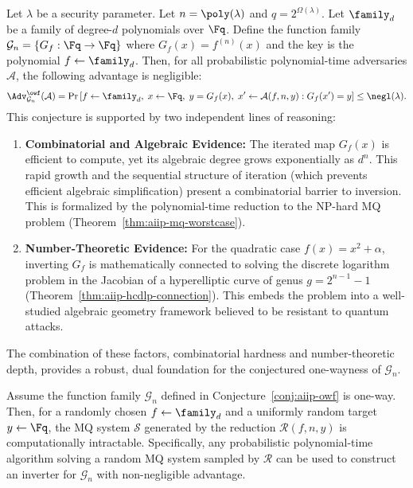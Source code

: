             \begin{conjecture}\label{conj:aiip-owf}
                Let $\lambda$ be a security parameter. Let $n = \poly(\lambda)$ and $q = 2^{\Omega(\lambda)}$. Let $\family_d$ be a family of degree-$d$ polynomials over $\Fq$. Define the function family $\mathcal{G}_n = \{ G_f: \Fq \to \Fq \}$ where $G_f(x) = f^{(n)}(x)$ and the key is the polynomial $f \leftarrow \family_d$.
                Then, for all probabilistic polynomial-time adversaries $\mathcal{A}$, the following advantage is negligible:
                \begin{equation}
                    \Adv_{\mathcal{G}_n}^{\owf}(\mathcal{A}) = \Pr\left[
                    f \leftarrow \family_d,\; x \leftarrow \Fq,\; y = G_f(x),\; x' \leftarrow \mathcal{A}(f, n, y) : G_f(x') = y
                    \right] \leq \negl(\lambda).
                \end{equation}
                This conjecture is supported by two independent lines of reasoning:
                \begin{enumerate}[topsep=0pt, itemsep=0pt, parsep=0pt]
                    \item \textbf{Combinatorial and Algebraic Evidence:} The iterated map $G_f(x)$ is efficient to compute, yet its algebraic degree grows exponentially as $d^n$. This rapid growth and the sequential structure of iteration (which prevents efficient algebraic simplification) present a combinatorial barrier to inversion. This is formalized by the polynomial-time reduction to the NP-hard MQ problem (Theorem~\ref{thm:aiip-mq-worstcase}).
                    \item \textbf{Number-Theoretic Evidence:} For the quadratic case $f(x) = x^2 + \alpha$, inverting $G_f$ is mathematically connected to solving the discrete logarithm problem in the Jacobian of a hyperelliptic curve of genus $g = 2^{n-1}-1$ (Theorem~\ref{thm:aiip-hcdlp-connection}). This embeds the problem into a well-studied algebraic geometry framework believed to be resistant to quantum attacks.
                \end{enumerate}
                The combination of these factors, combinatorial hardness and number-theoretic depth, provides a robust, dual foundation for the conjectured one-wayness of $\mathcal{G}_n$.
            \end{conjecture}
            \begin{theorem}\label{thm:aiip-mq-average}
                Assume the function family $\mathcal{G}_n$ defined in Conjecture~\ref{conj:aiip-owf} is one-way. Then, for a randomly chosen $f \leftarrow \family_d$ and a uniformly random target $y \leftarrow \Fq$, the MQ system $\mathcal{S}$ generated by the reduction $\mathcal{R}(f, n, y)$ is computationally intractable. Specifically, any probabilistic polynomial-time algorithm solving a random MQ system sampled by $\mathcal{R}$ can be used to construct an inverter for $\mathcal{G}_n$ with non-negligible advantage.
            \end{theorem}
